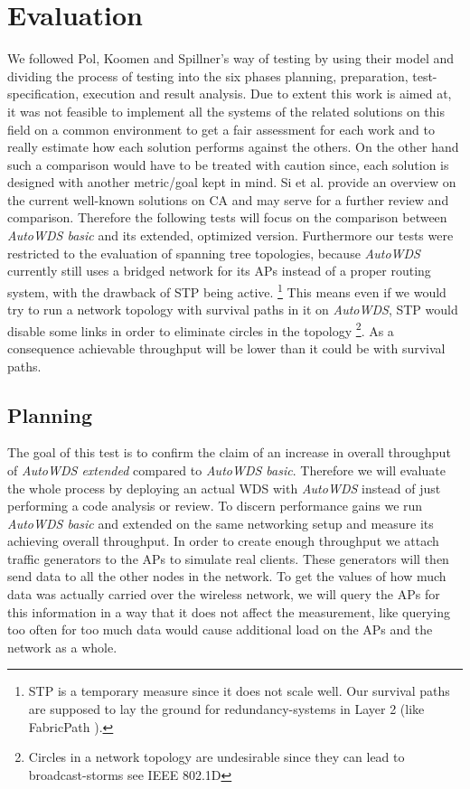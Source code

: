 \chapter{Evaluation}
We followed Pol, Koomen and Spillner's way of testing \cite{pol2000management} by using their model and dividing the process of testing into the six phases planning,
preparation, test-specification, execution and result analysis.
Due to extent this work is aimed at, it was not feasible to implement all the systems of the related solutions on this field on a common environment
to get a fair assessment for each work and to really estimate how each solution performs against the others. 
On the other hand such a comparison would have to be treated with caution since, each solution is designed with another metric/goal kept in mind.
Si et al. \cite{overview_caa} provide an overview on the current well-known solutions on \ac{CA} and may serve for a further review and comparison.
Therefore the following tests will focus on the comparison between \textit{AutoWDS basic} and its extended, optimized version.
Furthermore our tests were restricted to the evaluation of spanning tree topologies, because \textit{AutoWDS} currently 
still uses a bridged network for its APs instead of a proper routing system, with the drawback of \ac{STP} being active.
\footnote{\ac{STP} is a temporary measure since it does not scale well. 
Our survival paths are supposed to lay the ground for redundancy-systems in Layer 2 (like FabricPath \cite{fabricpath}).} 
This means even if we would try to run a network topology with survival paths in it on \textit{AutoWDS}, \ac{STP} would disable some links in order to 
eliminate circles in the topology \footnote{Circles in a network topology are undesirable since they can lead to broadcast-storms see \ac{IEEE} 802.1D}.
As a consequence achievable throughput will be lower than it could be with survival paths.

\newpage

  \section{Planning}
    The goal of this test is to confirm the claim of an increase in overall throughput of \textit{AutoWDS extended} compared to \textit{AutoWDS basic}.
    Therefore we will evaluate the whole process by deploying an actual \ac{WDS} with \textit{AutoWDS} instead of just performing a code analysis or review.
    To discern performance gains we run \textit{AutoWDS basic} and extended on the same networking setup and measure its achieving overall throughput.
    In order to create enough throughput we attach traffic generators to the APs to simulate real clients.
    These generators will then send data to all the other nodes in the network.
    To get the values of how much data was actually carried over the wireless network, we will query the APs for this information in a way that it 
    does not affect the measurement, like querying too often for too much data would cause additional load on the APs and the network as a whole.
    
